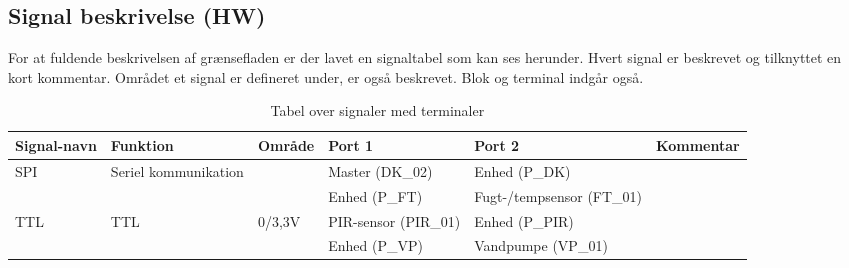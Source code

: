 \begin{table}[H]
\subsection{Signal beskrivelse (HW)}
For at fuldende beskrivelsen af grænsefladen er der lavet en signaltabel som kan ses herunder. Hvert signal er beskrevet og tilknyttet en kort kommentar. Området et signal er defineret under, er også beskrevet. Blok og terminal indgår også. 
\caption{Tabel over signaler med terminaler}
\begin{small}
\begin{tabular}{|p{2cm}|p{2cm}|p{2cm}|p{2cm}|p{2cm}|p{}|}
\hline

\textbf{Signal-navn}	&\textbf{Funktion} 		&\textbf{Område} &\textbf{Port 1} 	&\textbf{Port 2} 			&\textbf{Kommentar} \\ \hline

SPI 					&Seriel kommunikation 	& 				&Master (DK\_02)		&Enhed (P\_DK)				&					\\\cline{4-5}
					&						&				&Enhed (P\_FT)		&Fugt-/tempsensor (FT\_01)	&					\\ \hline

TTL 					&TTL 					&0\slash3,3V 	&PIR-sensor (PIR\_01) &Enhed (P\_PIR)			&					\\\cline{4-5}
					&						&				&Enhed (P\_VP)		&Vandpumpe (VP\_01)			&					\\ \hline

\end{tabular}
\end{small}
\label{table:Signaltabel}
\end{table}
